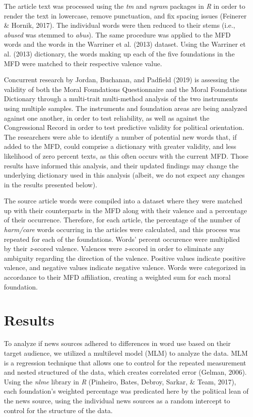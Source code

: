 \documentclass[,man]{apa6}
\begin{document}
The article text was processed using the \emph{tm} and \emph{ngram}
packages in \emph{R} in order to render the text in lowercase, remove
punctuation, and fix spacing issues (Feinerer \& Hornik, 2017). The
individual words were then reduced to their stems (i.e., \emph{abused}
was stemmed to \emph{abus}). The same procedure was applied to the MFD
words and the words in the Warriner et al. (2013) dataset. Using the
Warriner et al. (2013) dictionary, the words making up each of the five
foundations in the MFD were matched to their respective valence value.

Concurrent research by Jordan, Buchanan, and Padfield (2019) is
assessing the validity of both the Moral Foundations Questionnaire and
the Moral Foundations Dictionary through a multi-trait multi-method
analysis of the two instruments using multiple samples. The instruments
and foundation areas are being analyzed against one another, in order to
test reliability, as well as against the Congressional Record in order
to test predictive validity for political orientation. The researchers
were able to identify a number of potential new words that, if added to
the MFD, could comprise a dictionary with greater validity, and less
likelihood of zero percent texts, as this often occurs with the current
MFD. Those results have informed this analysis, and their updated
findings may change the underlying dictionary used in this analysis
(albeit, we do not expect any changes in the results presented below).

The source article words were compiled into a dataset where they were
matched up with their counterparts in the MFD along with their valence
and a percentage of their occurrence. Therefore, for each article, the
percentage of the number of \emph{harm/care} words occurring in the
articles were calculated, and this process was repeated for each of the
foundations. Words' percent occurence were multiplied by their
\emph{z}-scored valence. Valences were \emph{z}-scored in order to
eliminate any ambiguity regarding the direction of the valence. Positive
values indicate positive valence, and negative values indicate negative
valence. Words were categorized in accordance to their MFD affiliation,
creating a weighted sum for each moral foundation.

\section{Results}\label{results}

To analyze if news sources adhered to differences in word use based on
their target audience, we utilized a multilevel model (MLM) to analyze
the data. MLM is a regression technique that allows one to control for
the repeated measurement and nested structured of the data, which
creates correlated error (Gelman, 2006). Using the \emph{nlme} library
in \emph{R} (Pinheiro, Bates, Debroy, Sarkar, \& Team, 2017), each
foundation's weighted percentage was predicated here by the political
lean of the news source, using the individual news sources as a random
intercept to control for the structure of the data.
\end{document}
